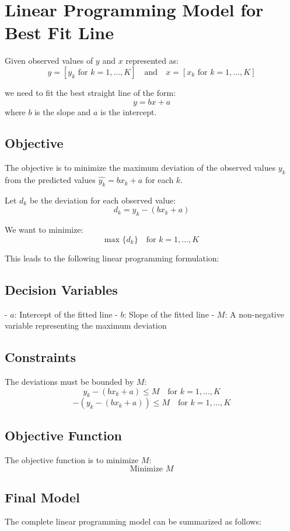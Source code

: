 \documentclass{article}
\begin{document}
\section*{Linear Programming Model for Best Fit Line}

Given observed values of \( y \) and \( x \) represented as:
\[
y = [y_k \text{ for } k = 1, \ldots, K] \quad \text{and} \quad x = [x_k \text{ for } k = 1, \ldots, K]
\]

we need to fit the best straight line of the form:
\[
y = bx + a
\]
where \( b \) is the slope and \( a \) is the intercept.

\subsection*{Objective}
The objective is to minimize the maximum deviation of the observed values \( y_k \) from the predicted values \( \hat{y_k} = bx_k + a \) for each \( k \). 

Let \( d_k \) be the deviation for each observed value:
\[
d_k = y_k - (bx_k + a)
\]

We want to minimize:
\[
\text{max }\{ d_k \} \quad \text{for } k = 1, \ldots, K
\]

This leads to the following linear programming formulation:

\subsection*{Decision Variables}
- \( a \): Intercept of the fitted line
- \( b \): Slope of the fitted line
- \( M \): A non-negative variable representing the maximum deviation

\subsection*{Constraints}
The deviations must be bounded by \( M \):
\[
y_k - (bx_k + a) \leq M \quad \text{for } k = 1, \ldots, K
\]
\[
-(y_k - (bx_k + a)) \leq M \quad \text{for } k = 1, \ldots, K
\]

\subsection*{Objective Function}
The objective function is to minimize \( M \):
\[
\text{Minimize } M
\]

\subsection*{Final Model}
The complete linear programming model can be summarized as follows:
\end{document}
